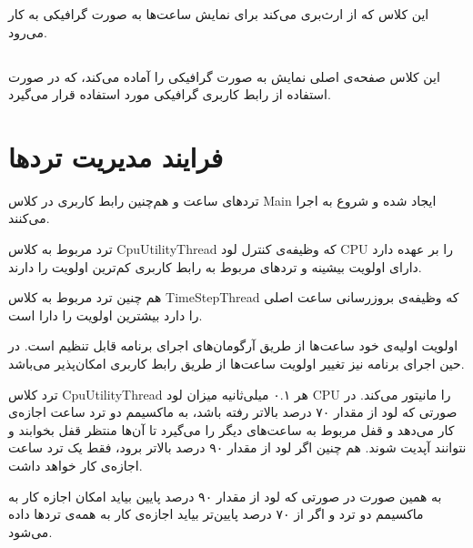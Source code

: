 \documentclass[oneside,a4paper,11pt]{report}
\begin{document}
	این کلاس که از 
	ارث‌بری می‌کند برای نمایش ساعت‌ها به صورت گرافیکی به کار می‌رود.
	
	\subsection{}
	این کلاس صفحه‌ی اصلی نمایش به صورت گرافیکی را آماده می‌کند، که در صورت استفاده از رابط کاربری گرافیکی مورد استفاده قرار می‌گیرد.
	
	
	\section{فرایند مدیریت تردها}
	
	تردهای ساعت و هم‌چنین رابط کاربری در کلاس Main ایجاد شده و شروع به اجرا می‌کنند. 
	
	ترد مربوط به کلاس CpuUtilityThread
	که وظیفه‌ی کنترل لود CPU را بر عهده دارد دارای اولویت بیشینه و تردهای مربوط به رابط کاربری کم‌ترین اولویت را دارند.
	
	هم چنین ترد مربوط به کلاس TimeStepThread که وظیفه‌ی بروزرسانی ساعت اصلی را دارد بیشترین اولویت را دارا است.
	
	اولویت اولیه‌ی خود ساعت‌ها از طریق آرگومان‌های اجرای برنامه قابل تنظیم است. در حین اجرای برنامه نیز تغییر اولویت ساعت‌ها از طریق رابط کاربری امکان‌پذیر می‌باشد.
	
	ترد کلاس CpuUtilityThread هر ۰.۱ میلی‌ثانیه میزان لود CPU را مانیتور می‌کند. در صورتی که لود از مقدار ۷۰ درصد بالاتر رفته باشد، به ماکسیمم دو ترد ساعت اجازه‌ی کار می‌دهد و قفل مربوط به ساعت‌های دیگر را می‌گیرد تا آن‌ها منتظر قفل بخوابند و نتوانند آپدیت شوند. هم چنین اگر لود از مقدار ۹۰ درصد بالاتر برود، فقط یک ترد ساعت اجازه‌ی کار خواهد داشت.
	
	به همین صورت در صورتی که لود از مقدار ۹۰ درصد پایین بیاید امکان اجازه کار به ماکسیمم دو ترد و اگر از ۷۰ درصد پایین‌تر بیاید اجازه‌ی کار به همه‌ی تردها داده می‌شود.
	
\end{document}
